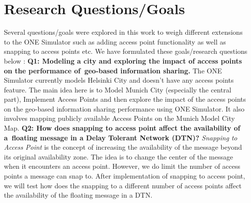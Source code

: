 \section{Research Questions/Goals}
Several questions/goals were explored in this work to weigh different extensions to the ONE Simulator such as adding access point functionality as well as snapping to access points etc. We have formulated these goals/research questions below :\newline
\newline\textbf{Q1: Modeling a city and exploring the impact of access points on the performance of geo-based information sharing.}\newline
The ONE Simulator currently models Helsinki City and doesn't have any access points feature. The main idea here is to Model Munich City (especially the central part), Implement Access Points and then explore the impact of the access points on the geo-based information sharing performance using ONE Simulator. It also involves mapping publicly available Access Points on the Munich Model City Map.\newline
\newline\textbf{Q2: How does snapping to access point affect the availability of a floating message in a Delay Tolerant Network (DTN)?}\newline
\textit{Snapping to Access Point} is the concept of increasing the availability of the message beyond its original availability zone. The idea is to change the center of the message when it encounters an access point. However, we do limit the number of access points a message can snap to. After implementation of snapping to access point, we will test how does the snapping to a different number of access points affect the availability of the floating message in a DTN.
